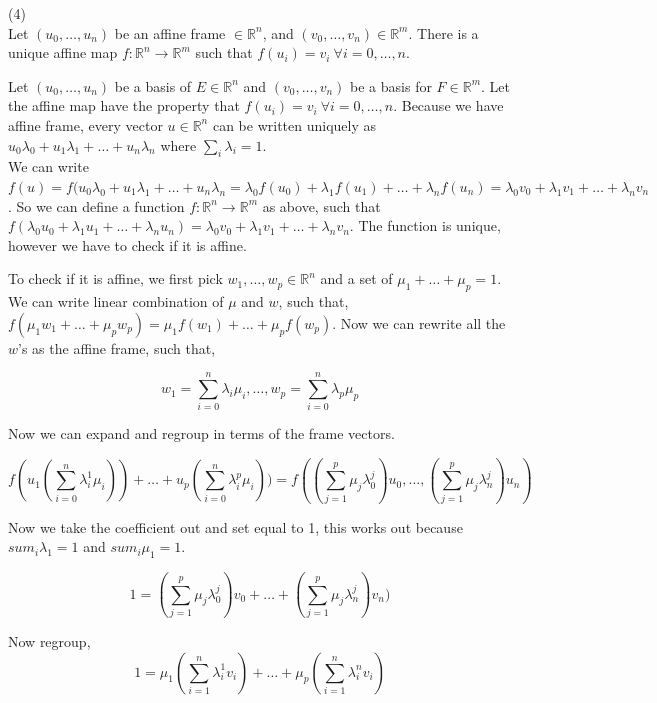 \documentclass[12pt]{article}
\begin{document}
\medskip
(4) \\
Let $(u_0, \ldots, u_n)$ be an affine frame $\in \mathbb{R} ^n$, and $(v_0, \ldots, v_n) \in \mathbb{R}^m$. There is a unique affine map $f: \mathbb{R} ^n \rightarrow \mathbb{R} ^m$ such that $f(u_i) = v_i\ \forall i = 0, \ldots,	n$. 

Let $(u_0, \ldots, u_n)$ be a basis of $E \in \mathbb{R}^n$ and $(v_0, \ldots, v_n)$ be a basis for $F \in \mathbb{R}^m $. Let the affine map have the property that $f(u_i) = v_i\ \forall i = 0, \ldots,	n$. Because we have affine frame, every vector $u \in \mathbb{R}^n$ can be written uniquely as $u_0\lambda_0 + u_1\lambda_1 + \ldots + u_n\lambda_n$ where $\sum_i \lambda_i = 1$. \\

We can write $f(u) = f(u_0\lambda_0 + u_1\lambda_1 + \ldots + u_n\lambda_n = \lambda_0f(u_0) + \lambda_1f(u_1) + \ldots + \lambda_nf(u_n) = \lambda_0v_0 + \lambda_1v_1 + \ldots + \lambda_nv_n$. So we can define a function $f: \mathbb{R} ^n \rightarrow \mathbb{R} ^m$ as above, such that $f(\lambda_0u_0 + \lambda_1u_1 + \ldots + \lambda_nu_n) = \lambda_0v_0 + \lambda_1v_1 + \ldots + \lambda_nv_n$. The function is unique, however we have to check if it is affine. 

To check if it is affine, we first pick $w_1, \ldots, w_p \in \mathbb{R}^n$ and a set of $\mu_1 + \ldots + \mu_p = 1$. We can write linear combination of $\mu$ and $w$, such that, 
$f(\mu_1 w_1 + \ldots + \mu_p w_p) = \mu_1 f(w_1) + \ldots + \mu_p f(w_p)$. Now we can rewrite all the $w$'s as the affine frame, such that, 

$$w_1 = \sum_{i=0}^{n} \lambda_i \mu_i, \ldots, w_p = \sum_{i=0}^{n} \lambda_p \mu_p$$

Now we can expand and regroup in terms of the frame vectors. 

$$ f(u_1(\sum_{i=0}^{n} \lambda_{i}^{1} \mu_i)) + \ldots + u_p(\sum_{i=0}^{n} \lambda_{i}^{p} \mu_i)) = f((\sum_{j=1}^{p} \mu_j \lambda_{0}^{j}) u_0, \ldots, (\sum_{j=1}^{p} \mu_j \lambda_{n}^{j}) u_n) $$ 

Now we take the coefficient out and set equal to 1, this works out because $sum_{i} \lambda_1 = 1$ and  $sum_{i} \mu_1 = 1$. 

$$1 = (\sum_{j=1}^{p} \mu_j \lambda_{0}^{j}) v_0 + \ldots + (\sum_{j=1}^{p} \mu_j \lambda_{n}^{j}) v_n) $$

Now regroup, 
$$1 = \mu_1(\sum_{i=1}^{n} \lambda_{i}^{1} v_i) + \ldots + \mu_p(\sum_{i=1}^{n} \lambda_{i}^{n} v_i) $$ 
\end{document}
